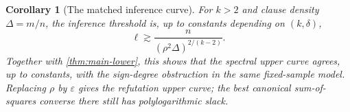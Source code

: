 \documentclass[11pt]{article}
\newtheorem{corollary}[corollary]{Corollary}
\theoremstyle{definition}
\theoremstyle{remark}
\newcommand{\1}{\mathbf 1}
\newcommand{\eps}{\varepsilon}
\newcommand{\Dkl}{\mathsf D_{k,\ell}}
\numberwithin{equation}{section}
\begin{document}
\begin{corollary}[The matched inference curve]\label{cor:curve}
For $k>2$ and clause density $\Delta=m/n$, the inference threshold is,
up to constants depending on $(k,\delta)$,
\[
 \ell\gtrsim \frac{n}{(\rho^2\Delta)^{2/(k-2)}}.
\]
Together with \cref{thm:main-lower}, this shows that the spectral upper
curve agrees, up to constants, with the sign-degree
obstruction in the same fixed-sample model.  Replacing $\rho$ by $\eps$
gives the refutation upper curve; the best canonical sum-of-squares
converse there still has polylogarithmic slack.
\end{corollary}
\end{document}
